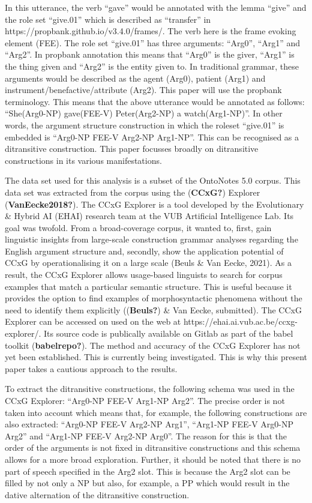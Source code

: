 \documentclass[
  letterpaper,
  DIV=11,
  numbers=noendperiod]{scrartcl}
\begin{document}
In this utterance, the verb ``gave'' would be annotated with the lemma
``give'' and the role set ``give.01'' which is described as ``transfer''
in https://propbank.github.io/v3.4.0/frames/. The verb here is the frame
evoking element (FEE). The role set ``give.01'' has three arguments:
``Arg0'', ``Arg1'' and ``Arg2''. In propbank annotation this means that
``Arg0'' is the giver, ``Arg1'' is the thing given and ``Arg2'' is the
entity given to. In traditional grammar, these arguments would be
described as the agent (Arg0), patient (Arg1) and
instrument/benefactive/attribute (Arg2). This paper will use the
propbank terminology. This means that the above utterance would be
annotated as follows: ``She(Arg0-NP) gave(FEE-V) Peter(Arg2-NP) a
watch(Arg1-NP)''. In other words, the argument structure construction in
which the roleset ``give.01'' is embedded is ``Arg0-NP FEE-V Arg2-NP
Arg1-NP''. This can be recognised as a ditransitive construction. This
paper focusses broadly on ditransitive constructions in its various
manifestations.

The data set used for this analysis is a subset of the OntoNotes 5.0
corpus. This data set was extracted from the corpus using the
(\textbf{CCxG?}) Explorer (\textbf{VanEecke2018?}). The CCxG Explorer is
a tool developed by the Evolutionary \& Hybrid AI (EHAI) research team
at the VUB Artificial Intelligence Lab. Its goal was twofold. From a
broad-coverage corpus, it wanted to, first, gain linguistic insights
from large-scale construction grammar analyses regarding the English
argument structure and, secondly, show the application potential of CCxG
by operationalising it on a large scale (Beuls \& Van Eecke, 2021). As a
result, the CCxG Explorer allows usage-based linguists to search for
corpus examples that match a particular semantic structure. This is
useful because it provides the option to find examples of
morphosyntactic phenomena without the need to identify them explicitly
((\textbf{Beuls?}) \& Van Eecke, submitted). The CCxG Explorer can be
accessed on used on the web at https://ehai.ai.vub.ac.be/ccxg-explorer/.
Its source code is publically available on Gitlab as part of the babel
toolkit (\textbf{babelrepo?}). The method and accuracy of the CCxG
Explorer has not yet been established. This is currently being
investigated. This is why this present paper takes a cautious approach
to the results.

To extract the ditransitive constructions, the following schema was used
in the CCxG Explorer: ``Arg0-NP FEE-V Arg1-NP Arg2''. The precise order
is not taken into account which means that, for example, the following
constructions are also extracted: ``Arg0-NP FEE-V Arg2-NP Arg1'',
``Arg1-NP FEE-V Arg0-NP Arg2'' and ``Arg1-NP FEE-V Arg2-NP Arg0''. The
reason for this is that the order of the arguments is not fixed in
ditransitive constructions and this schema allows for a more broad
exploration. Further, it should be noted that there is no part of speech
specified in the Arg2 slot. This is because the Arg2 slot can be filled
by not only a NP but also, for example, a PP which would result in the
dative alternation of the ditransitive construction.
\end{document}
